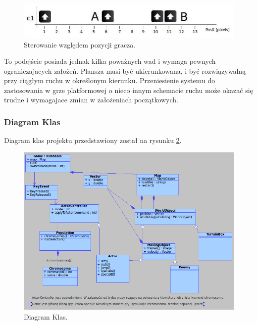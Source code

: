 \begin{par}
\begin{enumerate}
\begin{par}
		\begin{par}
		\begin{figure}[!h]
		\centering
		\includegraphics[width=\textwidth]{obrazki/sterowanie2.jpg}
		\caption{Sterowanie względem pozycji gracza.}
		\label{fig:sterowanie2}
		\end{figure}
		\end{par}

		To podejście posiada jednak kilka poważnych wad i wymaga pewnych ograniczajacych założeń.
		Plansza musi być ukierunkowana, i być rozwiązywalną przy ciągłym ruchu w określonym kierunku.
		Przeniesienie systemu do zastosowania w grze platformowej o nieco innym schemacie ruchu może okazać się trudne i wymagajace zmian w założeniach początkowych.
	\end{par}
	\end{enumerate}


	\subsubsection{Diagram Klas}
	\begin{par}
	Diagram klas projektu przedstawiony został na rysunku \ref{fig:diagram_klas}.
	\end{par}
	\begin{figure}[!h]
	\centering
	\includegraphics[width=\textwidth]{obrazki/diagram_klas.png}
	\caption{Diagram Klas.}
	\label{fig:diagram_klas}
	\end{figure}
\end{par}
